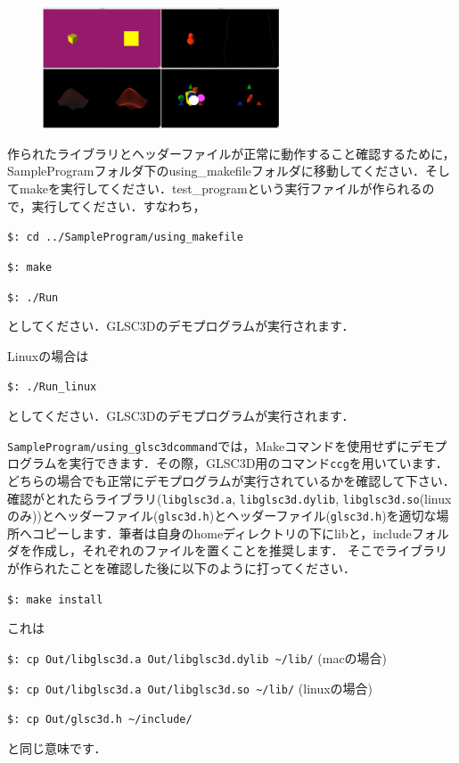 \documentclass[platex,a4paper,12pt]{jsarticle}%
\begin{document}
\begin{figure}
\vspace{-1\baselineskip}
	\includegraphics[width=70mm]{./Figures/eps/007.eps}
\end{figure}

作られたライブラリとヘッダーファイルが正常に動作すること確認するために，SampleProgramフォルダ下のusing\_makefileフォルダに移動してください．そしてmakeを実行してください．test\_programという実行ファイルが作られるので，実行してください．すなわち，

\verb|$: cd ../SampleProgram/using_makefile|

\verb|$: make|

\verb|$: ./Run|

\noindent
としてください．GLSC3Dのデモプログラムが実行されます．

Linuxの場合は

\verb|$: ./Run_linux|

\noindent
としてください．GLSC3Dのデモプログラムが実行されます．

\verb|SampleProgram/using_glsc3dcommand|では，Makeコマンドを使用せずにデモプログラムを実行できます．その際，GLSC3D用のコマンド\verb|ccg|を用いています．どちらの場合でも正常にデモプログラムが実行されているかを確認して下さい．確認がとれたらライブラリ(\verb|libglsc3d.a|, \verb|libglsc3d.dylib|, \verb|libglsc3d.so|(linuxのみ))とヘッダーファイル(\verb|glsc3d.h|)とヘッダーファイル(\verb|glsc3d.h|)を適切な場所へコピーします．筆者は自身のhomeディレクトリの下にlibと，includeフォルダを作成し，それぞれのファイルを置くことを推奨します．
そこでライブラリが作られたことを確認した後に以下のように打ってください．

\verb|$: make install |

これは

\verb|$: cp Out/libglsc3d.a Out/libglsc3d.dylib ~/lib/| (macの場合)

\verb|$: cp Out/libglsc3d.a Out/libglsc3d.so ~/lib/| (linuxの場合)

\verb|$: cp Out/glsc3d.h ~/include/|

と同じ意味です．
\end{document}
